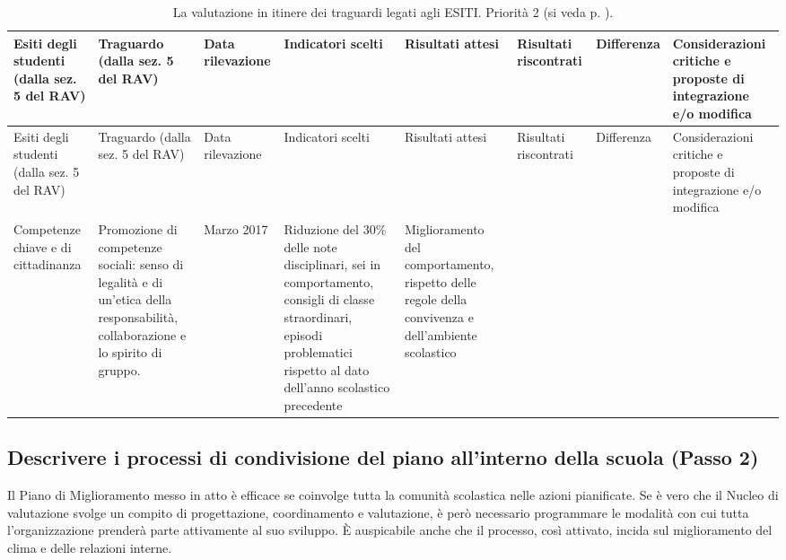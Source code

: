 \documentclass[12pt,a4paper,oneside]{memoir}
\begin{document}
\begin{footnotesize}
\begin{longtable}{|>{\raggedright}p{1.248cm}|>{\raggedright}p{1.248cm}|>{\raggedright}p{1.248cm}|>{\raggedright}p{1.248cm}|>{\raggedright}p{1.248cm}|>{\raggedright}p{1.248cm}|>{\raggedright}p{1.248cm}|>{\raggedright\arraybackslash}p{1.248cm}|}
\caption{La valutazione in itinere dei traguardi legati agli ESITI. Priorità 2 (si veda p. \pageref{priorità}).}  \label{valutazione-in-itinere2}\\
\hline
\rowcolor{violetto}
Esiti degli studenti (dalla sez. 5 del RAV)&Tra\-guar\-do (dalla sez. 5 del RAV)&Data ri\-le\-va\-zio\-ne&In\-di\-ca\-to\-ri scel\-ti&Ri\-sul\-ta\-ti at\-te\-si&Ri\-sul\-ta\-ti ris\-con\-tra\-ti&Dif\-fe\-ren\-za&Con\-si\-de\-ra\-zio\-ni cri\-ti\-che e pro\-po\-ste di in\-te\-gra\-zio\-ne e/o mo\-di\-fi\-ca\\\hline
\endfirsthead
\hline
\rowcolor{violetto}
Esiti degli studenti (dalla sez. 5 del RAV)&Tra\-guar\-do (dalla sez. 5 del RAV)&Data ri\-le\-va\-zio\-ne&In\-di\-ca\-to\-ri scel\-ti&Ri\-sul\-ta\-ti at\-te\-si&Ri\-sul\-ta\-ti ris\-con\-tra\-ti&Dif\-fe\-ren\-za&Con\-si\-de\-ra\-zio\-ni cri\-ti\-che e pro\-po\-ste di in\-te\-gra\-zio\-ne e/o mo\-di\-fi\-ca\\\hline
\endhead
\hline \multicolumn{8}{r}{\emph{\normalsize{Continua nella pagina successiva}}}
\endfoot
\hline
\endlastfoot
Com\-pe\-ten\-ze chiave e di cit\-ta\-di\-nan\-za&Pro\-mo\-zio\-ne di com\-pe\-ten\-ze so\-cia\-li: sen\-so di le\-ga\-li\-tà e di un'etica della responsabilità, collaborazione e lo spirito di gruppo.&Mar\-zo 2017&Ri\-du\-zio\-ne del $30\%$ delle note disciplinari, sei in comportamento, consigli di classe straordinari, episodi problematici rispetto al dato dell'anno scolastico precedente&Mi\-glio\-ra\-men\-to del com\-por\-ta\-men\-to, rispetto delle regole della convivenza e dell'ambiente scolastico&&&\\\hline
\end{longtable}
\end{footnotesize}

\subsection[Passo 2. Descrivere i processi di condivisione]{Descrivere i processi di condivisione del piano all'interno della scuola (Passo 2)}

Il Piano di Miglioramento messo in atto è efficace se coinvolge tutta la comunità scolastica nelle azioni pianificate. Se è vero che il Nucleo di valutazione svolge un compito di progettazione, coordinamento e valutazione, è però necessario programmare le modalità con cui tutta l'organizzazione prenderà parte attivamente al suo sviluppo. È auspicabile anche che il processo, così attivato, incida sul miglioramento del clima e delle relazioni interne.\\
\end{document}
